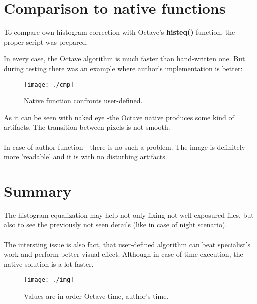 \documentclass[eng,openany]{mgr}
\begin{document}
\section{Comparison to native functions}
To compare own histogram correction with Octave's \textbf{histeq()} function, the proper script was prepared.

In every case, the Octave algorithm is much faster than hand-written one. But during testing there was an example where author's implementation is better:
\begin{figure}[h]
\centering
\texttt{[image: ./cmp]}
\caption{Native function confronts user-defined.}
\label{fig:cmp}
\end{figure}
As it can be seen with naked eye -the Octave native produces some kind of artifacts. The transition between pixels is not smooth.\\
\\
In case of author function - there is no such a problem. The image is definitely more 'readable' and it is with no disturbing artifacts.
\section{Summary}
The histogram equalization may help not only fixing not well exposured files, but also to see the previously not seen details (like in case of night scenario).
\\
\\
The intersting issue is also fact, that user-defined algorithm can beat specialist's work and perform better visual effect. Although in case of time execution, the native solution is a lot faster.
\begin{figure}[h]
\centering
\texttt{[image: ./img]}
\caption{Values are in order Octave time, author's time.}
\label{fig:img}
\end{figure}
\end{document}
